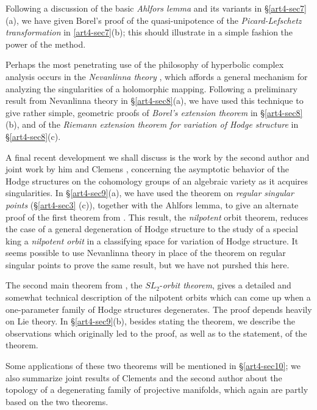 Following a discussion of the basic \textit{Ahlfors lemma} and its variants in \S \ref{art4-sec7}(a), we have given Borel's proof of the quasi-unipotence of the \textit{Picard-Lefschetz transformation} in \ref{art4-sec7}(b); this should illustrate in a simple fashion the power of the method.

Perhaps the most penetrating use of the philosophy of hyperbolic complex analysis occurs in the \textit{Nevanlinna theory} \cite{art4-key24}, which affords a general mechanism for analyzing the singularities of a holomorphic mapping. Following a preliminary result from Nevanlinna theory in \S \ref{art4-sec8}(a), we have used this technique to give rather simple, geometric proofs of \textit{Borel's extension theorem} \cite{art4-key5} in \S \ref{art4-sec8}(b), and of the \textit{Riemann extension theorem for variation of Hodge structure} \cite{art4-key19} in \S \ref{art4-sec8}(c).

A final recent development we shall discuss is the work by the second author \cite{art4-key41} and joint work by him and Clemens \cite{art4-key10}, concerning the asymptotic behavior of the Hodge structures on the cohomology groups of an algebraic variety as it acquires singularities. In \S \ref{art4-sec9}(a), we have used the theorem on \textit{regular singular points} (\S \ref{art4-sec3} (c)), together with the Ahlfors lemma, to give an alternate proof of the first theorem from \cite{art4-key41}. This result, the \textit{nilpotent} orbit theorem, reduces the case of a general degeneration of Hodge structure to the study of a special king a \textit{nilpotent orbit} in a classifying space for variation of Hodge structure. It seems possible to use Nevanlinna theory in place of the theorem on regular singular points to prove the same result, but we have not purshed this here.

The second main theorem from \cite{art4-key41}, the $SL_2$-\textit{orbit theorem}, gives a detailed and somewhat technical description of the nilpotent orbits which can come up when a one-parameter family of Hodge structures degenerates. The proof depends heavily on Lie theory. In \S \ref{art4-sec9}(b), besides stating the theorem, we describe the observations which originally led to the proof, as well as to the statement, of the theorem.

Some applications of these two theorems will be mentioned in \S\ref{art4-sec10}; we also summarize joint results of Clements and the second author about the topology of a degenerating family of projective manifolds, which again are partly based on the two theorems.

